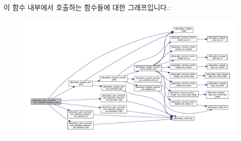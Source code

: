 이 함수 내부에서 호출하는 함수들에 대한 그래프입니다.\+:
\nopagebreak
\begin{figure}[H]
\begin{center}
\leavevmode
\includegraphics[width=350pt]{group__command__start__operation__response_gaa2a809cfffdbb660ff1e912ed3c8ad0f_cgraph}
\end{center}
\end{figure}


